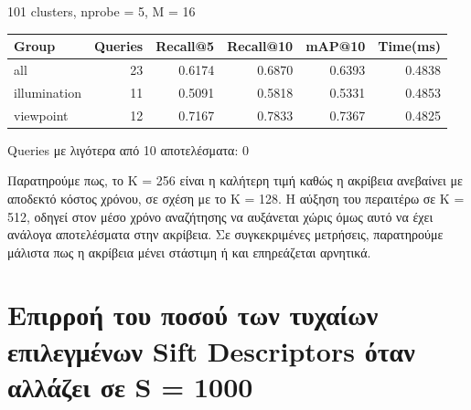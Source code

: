 \documentclass [conference]{IEEEtran}
\begin{document}
\begin{itemize}
     \begin{table}[H]
    \centering
    \small
    \setlength{\tabcolsep}{3pt}
    101 clusters, nprobe = 5, Μ = 16
    \par\smallskip
    \begin{tabular}{l r r r r r}
    \hline
    \textbf{Group} & \textbf{Queries} & \textbf{Recall@5} & \textbf{Recall@10} & \textbf{mAP@10} & \textbf{Time(ms)} \\
    \hline
    all & 23 & 0.6174 & 0.6870 & 0.6393 & 0.4838 \\
    illumination & 11 & 0.5091 & 0.5818 & 0.5331 & 0.4853 \\
    viewpoint & 12 & 0.7167 & 0.7833 & 0.7367 & 0.4825 \\
    \hline
    \end{tabular}
    \par\smallskip
    \footnotesize Queries με λιγότερα από 10 αποτελέσματα: 0
    \end{table}
     
    
\end{itemize}

Παρατηρούμε πως, το Κ = 256 είναι η καλήτερη τιμή καθώς η ακρίβεια ανεβαίνει με αποδεκτό κόστος χρόνου, σε σχέση με το Κ = 128. Η αύξηση του περαιτέρω σε Κ = 512, οδηγεί στον μέσο χρόνο αναζήτησης να αυξάνεται χώρις όμως αυτό να έχει ανάλογα αποτελέσματα στην ακρίβεια. Σε συγκεκριμένες μετρήσεις, παρατηρούμε μάλιστα πως η ακρίβεια μένει στάστιμη ή και επηρεάζεται αρνητικά. 

\section{Επιρροή του ποσού των τυχαίων επιλεγμένων Sift Descriptors όταν αλλάζει σε S = 1000}
\end{document}
